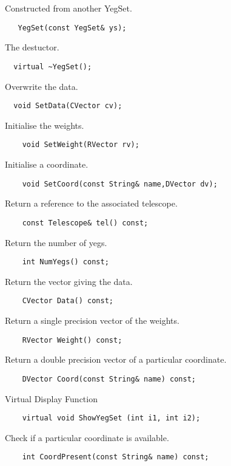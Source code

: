    Constructed from another YegSet.
\begin{verbatim}
   YegSet(const YegSet& ys);
\end{verbatim}

   The destuctor.
\begin{verbatim}
  virtual ~YegSet();
\end{verbatim}
  
    Overwrite the data.
\begin{verbatim}
  void SetData(CVector cv);
\end{verbatim}
  
    Initialise the weights.
\begin{verbatim}
    void SetWeight(RVector rv);
\end{verbatim}

    Initialise a coordinate.
\begin{verbatim}
    void SetCoord(const String& name,DVector dv);
\end{verbatim}

    Return a reference to the associated telescope.
\begin{verbatim}
    const Telescope& tel() const;
\end{verbatim}

   Return the number of yegs.
\begin{verbatim}
    int NumYegs() const;
\end{verbatim}
  
    Return the vector giving the data.
\begin{verbatim}
    CVector Data() const;
\end{verbatim}

   Return a single precision vector of the weights.
\begin{verbatim}
    RVector Weight() const;
\end{verbatim}
 
   Return a double precision vector of a particular coordinate.
\begin{verbatim}
    DVector Coord(const String& name) const;
\end{verbatim}

   Virtual Display Function
\begin{verbatim}
    virtual void ShowYegSet (int i1, int i2);
\end{verbatim}

   Check if a particular coordinate is available.
\begin{verbatim}
    int CoordPresent(const String& name) const;
\end{verbatim}

